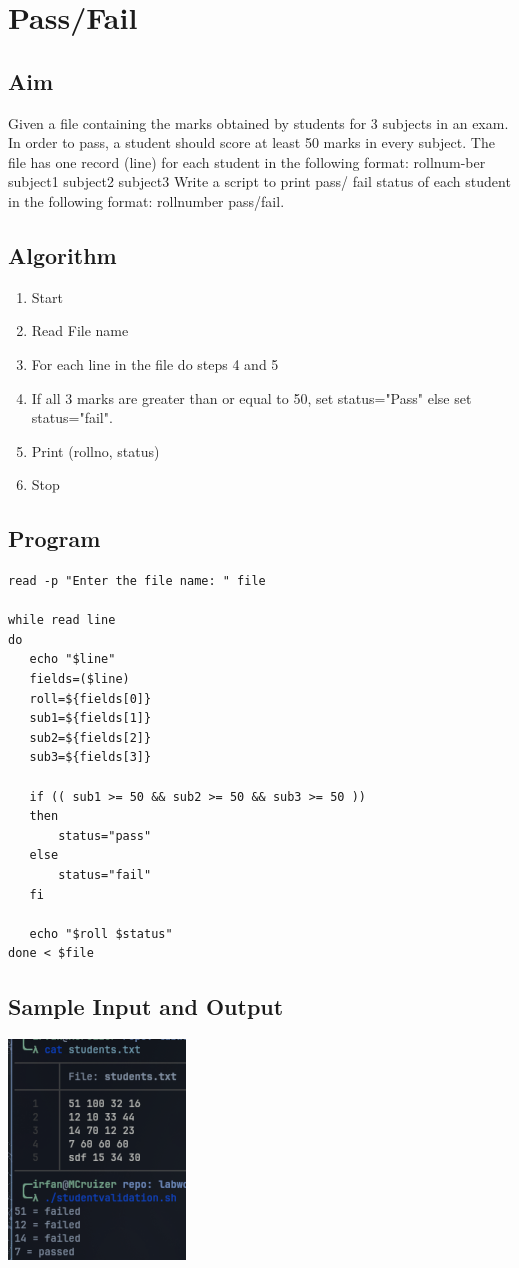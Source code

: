 \section{Pass/Fail}

\subsection{Aim}
Given a file containing the marks obtained by students for 3 subjects in an exam. In order to pass, a student should score at least 50 marks in every subject. The file has one record (line) for each student in the following format: rollnum-ber subject1 subject2 subject3 Write a script to print pass/ fail status of each student in the following format: rollnumber pass/fail.

\subsection{Algorithm}
\begin{enumerate}
   \item Start
   \item Read File name
   \item For each line in the file do steps 4 and 5
   \item If all 3 marks are greater than or equal to 50, set status="Pass" else set status="fail".
   \item Print (rollno, status)
   \item Stop
\end{enumerate}

\subsection{Program}
\begin{lstlisting}[label={list:program:pass_fail}]
read -p "Enter the file name: " file

while read line
do
   echo "$line"
   fields=($line)
   roll=${fields[0]}
   sub1=${fields[1]}
   sub2=${fields[2]}
   sub3=${fields[3]}

   if (( sub1 >= 50 && sub2 >= 50 && sub3 >= 50 ))
   then
       status="pass"
   else
       status="fail"
   fi

   echo "$roll $status"
done < $file
\end{lstlisting}

\subsection{Sample Input and Output}
 \includegraphics[]{Cycle_1//Outputs/passorfial.png}

